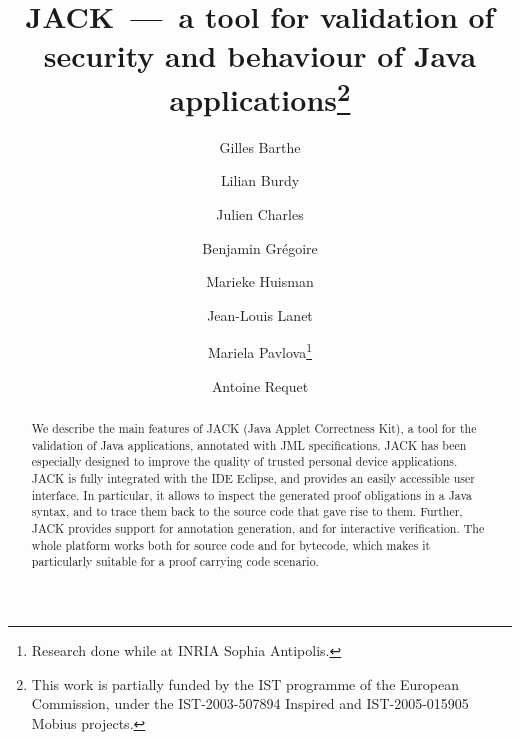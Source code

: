 \documentclass{llncs}
\title{JACK~---~a tool for validation of security and behaviour of Java
applications\thanks{This work is partially funded by the IST programme
of the European Commission, under the IST-2003-507894
\textsf{Inspired} and IST-2005-015905 \textsf{Mobius} projects.}}
\author{Gilles Barthe\inst{1} \and
        Lilian Burdy\and %
        Julien Charles\inst{1} \and
        Benjamin Gr\'egoire\inst{1} \and
        Marieke Huisman\inst{1} \and
        Jean-Louis Lanet\inst{2} \and
        Mariela Pavlova\inst{3}\thanks{Research done while at INRIA Sophia Antipolis.} \and
        Antoine Requet\inst{2}}
\institute{INRIA Sophia Antipolis, France \and 
           gemalto, France \and 
           Ludwig-Maximilians-Universit\"at M\"unchen, Germany}
\begin{document}
\maketitle      
\begin{abstract}
We describe the main features of JACK (Java Applet Correctness Kit), a
tool for the validation of Java applications, annotated with JML
specifications. JACK has been especially designed to improve the
quality of trusted personal device applications. JACK is fully
integrated with the IDE Eclipse, and provides an easily accessible
user interface. In particular, it allows to inspect the generated
proof obligations in a Java syntax, and to trace them back to the
source code that gave rise to them. Further, JACK provides support for
annotation generation, and for interactive verification. The whole
platform works both for source code and for bytecode, which makes it
particularly suitable for a proof carrying code scenario.
\end{abstract}
        










\end{document}
